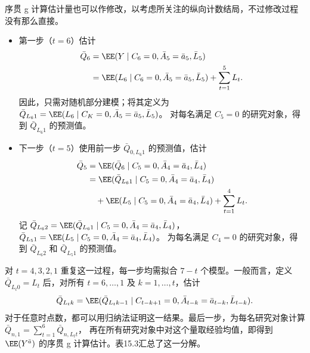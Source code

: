 序贯 g 计算估计量也可以作修改，以考虑所关注的纵向计数结局，不过修改过程没有那么直接。
\begin{itemize}
\item 第一步（$t=6$）估计
\[
\begin{aligned}
 \bar Q_6&=\EE(Y\mid C_6=0,\bar A_5=\bar a_5,\bar L_5)\\
 &=\EE(L_6\mid C_6=0,\bar A_5=\bar a_5,\bar L_5)+\sum_{t=1}^{5}L_t.
\end{aligned}
\]
因此，只需对随机部分建模；将其定义为
$\bar Q_{L_6 1}=\EE(L_6\mid C_K=0,\bar A_5=\bar a_5,\bar L_5)$。
对每名满足 $C_5=0$ 的研究对象，得到 $\bar Q_{L_6 1}$ 的预测值。
\item 下一步（$t=5$）使用前一步 $\bar Q_{0,L_6 1}$ 的预测值，估计
\[
\begin{aligned}
 \bar Q_5&=\EE(\bar Q_6\mid C_5=0,\bar A_4=\bar a_4,\bar L_4)\\
 &=\EE(\bar Q_{L_6 1}\mid C_5=0,\bar A_4=\bar a_4,\bar L_4)\\
 &\quad+\EE(L_5\mid C_5=0,\bar A_4=\bar a_4,\bar L_4)
 +\sum_{t=1}^{4}L_t.
\end{aligned}
\]
记 $\bar Q_{L_6 2}=\EE(\bar Q_{L_6 1}\mid C_5=0,\bar A_4=\bar a_4,\bar L_4)$，
$\bar Q_{L_5 1}=\EE(L_5\mid C_5=0,\bar A_4=\bar a_4,\bar L_4)$。
为每名满足 $C_4=0$ 的研究对象，得到 $\bar Q_{L_6 2}$ 和 $\bar Q_{L_5 1}$ 的预测值。
\end{itemize}

对 $t=4,3,2,1$ 重复这一过程，每一步均需拟合 $7-t$ 个模型。一般而言，定义 $\bar Q_{L_t 0}=L_t$ 后，对所有 $t=6,\ldots,1$ 及 $k=1,\ldots,t$，估计
\[
 \bar Q_{L_t k}=\EE(\bar Q_{L_t k-1}\mid C_{t-k+1}=0,
 \bar A_{t-k}=\bar a_{t-k},\bar L_{t-k}).
\]
对于任意时点数，都可以用归纳法证明这一结果。最后一步，为每名研究对象计算
$\bar Q_{n,1}=\sum_{t=1}^{6}\bar Q_{n,L_t t}$，
再在所有研究对象中对这个量取经验均值，即得到 $\EE(Y^{\bar a})$ 的序贯 g 计算估计。表15.3汇总了这一分解。

